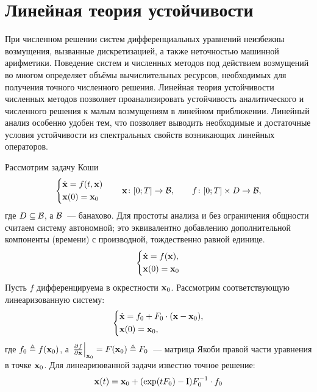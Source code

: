 \section{Линейная теория устойчивости}
\label{section:theory:linear_stability_theory}

При численном решении систем дифференциальных уравнений неизбежны возмущения,
вызванные дискретизацией, а также неточностью машинной арифметики.
Поведение систем и численных методов под действием возмущений во многом определяет
объёмы вычислительных ресурсов, необходимых для получения точного численного решения.
Линейная теория устойчивости численных методов позволяет проанализировать устойчивость
аналитического и численного решения к малым возмущениям в линейном приближении.
Линейный анализ особенно удобен тем,
что позволяет выводить необходимые и достаточные условия устойчивости
из спектральных свойств возникающих линейных операторов.

Рассмотрим задачу Коши
\begin{equation}
    \label{eq:linear_stability_theory:initial_value_problem}
    \begin{dcases}
        \dot{\mathbf{x}} = f(t, \mathbf{x}) \\
        \mathbf{x}(0) = \mathbf{x}_0
    \end{dcases}
    \qquad
    \mathbf{x} \colon [0; T] \to \mathcal{B}, \qquad f \colon [0;T] \times D \to \mathcal{B},
\end{equation}
%
где $ D \subseteq \mathcal{B} $,
а $ \mathcal{B} $~--- банахово.
Для простоты анализа и без ограничения общности считаем систему автономной;
это эквивалентно добавлению дополнительной компоненты (времени) с производной,
тождественно равной единице.
%
\begin{equation}
    \label{eq:linear_stability_theory:autonomous_initial_value_problem}
    \begin{dcases}
        \dot{\mathbf{x}} = f(\mathbf{x}), \\
        \mathbf{x}(0) = \mathbf{x}_0
    \end{dcases}
\end{equation}
%
Пусть $ f $ дифференцируема в окрестности $ \mathbf{x}_0 $.
Рассмотрим соответствующую линеаризованную систему:
%
\begin{equation}
    \label{eq:linear_stability_theory:linearized_initial_value_problem}
    \begin{dcases}
        \dot{\mathbf{x}} = f_0 + F_0 \cdot (\mathbf{x} - \mathbf{x}_0), \\
        \mathbf{x}(0) = \mathbf{x}_0,
    \end{dcases}
\end{equation}
%
где $ f_0 \triangleq f(\mathbf{x}_0)$,
а $ \left. \frac{\partial f}{\partial \mathbf{x}} \right|_{\mathbf{x}_0} = F(\mathbf{x}_0) \triangleq F_0 $~---
матрица Якоби правой части уравнения в точке $ \mathbf{x}_0 $.
Для линеаризованной задачи известно точное решение:
\begin{equation}
    \label{eq:linear_stability_theory:linearized_solution}
    \mathbf{x}(t) = \mathbf{x}_0 + (\exp(t F_0) - \mathrm{I}) F_0^{-1} \cdot f_0
\end{equation}


